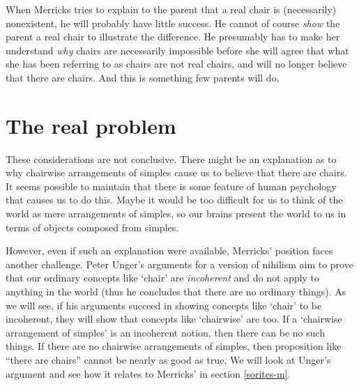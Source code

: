 \documentclass[11pt]{article}
\begin{document}
\begin{spacing}{1.25}
When Merricks tries to explain to the parent that a real chair is
(necessarily) nonexistent, he will probably have little success.  He
cannot of course {\em show} the parent a real chair to illustrate the
difference.  He presumably has to make her understand {\em why} chairs
are necessarily impossible before she will agree that what she has
been referring to as chairs are not real chairs, and will no longer
believe that there are chairs.  And this is something few parents will
do.

\section{The real problem}
These considerations are not conclusive.  There might be an
explanation as to why chairwise arrangements of simples cause us to
believe that there are chairs.  It seems possible to maintain that
there is some feature of human psychology that causes us to do this.
Maybe it would be too difficult for us to think of the world as mere
arrangements of simples, so our brains present the world to us in
terms of objects composed from simples.

However, even if such an explanation were available, Merricks'
position faces another challenge.  Peter Unger's arguments for a
version of nihilism aim to prove that our ordinary concepts like
`chair' are {\em incoherent} and do not apply to anything in the world
(thus he concludes that there are no ordinary things).  As we will
see, if his arguments succeed in showing concepts like `chair' to be
incoherent, they will show that concepts like `chairwise' are too.  If
a `chairwise arrangement of simples' is an incoherent notion, then
there can be no such things.  If there are no chairwise arrangements
of simples, then proposition like ``there are chairs'' cannot be
nearly as good as true.  We will look at Unger's argument and see how
it relates to Merricks' in section \ref{sorites-m}.

\ifstandalone
\end{spacing}


\fi
\end{document}
